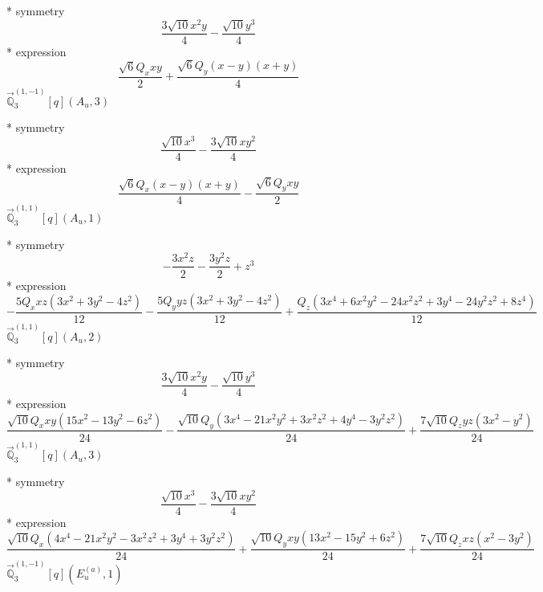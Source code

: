 \documentclass[fleqn,8pt]{jsarticle}
\begin{document}
\noindent\quad ** symmetry
\begin{dmath*}
\frac{3 \sqrt{10} x^{2} y}{4} - \frac{\sqrt{10} y^{3}}{4}
\end{dmath*}
\noindent\quad ** expression
\begin{dmath*}
\frac{\sqrt{6} Q_{x} x y}{2} + \frac{\sqrt{6} Q_{y} \left(x - y\right) \left(x + y\right)}{4}
\end{dmath*}
\noindent\quad $\vec{\mathbb{Q}}_{3}^{(1,-1)}[q](A_{u},3)$

\noindent\quad ** symmetry
\begin{dmath*}
\frac{\sqrt{10} x^{3}}{4} - \frac{3 \sqrt{10} x y^{2}}{4}
\end{dmath*}
\noindent\quad ** expression
\begin{dmath*}
\frac{\sqrt{6} Q_{x} \left(x - y\right) \left(x + y\right)}{4} - \frac{\sqrt{6} Q_{y} x y}{2}
\end{dmath*}
\noindent\quad $\vec{\mathbb{Q}}_{3}^{(1,1)}[q](A_{u},1)$

\noindent\quad ** symmetry
\begin{dmath*}
- \frac{3 x^{2} z}{2} - \frac{3 y^{2} z}{2} + z^{3}
\end{dmath*}
\noindent\quad ** expression
\begin{dmath*}
- \frac{5 Q_{x} x z \left(3 x^{2} + 3 y^{2} - 4 z^{2}\right)}{12} - \frac{5 Q_{y} y z \left(3 x^{2} + 3 y^{2} - 4 z^{2}\right)}{12} + \frac{Q_{z} \left(3 x^{4} + 6 x^{2} y^{2} - 24 x^{2} z^{2} + 3 y^{4} - 24 y^{2} z^{2} + 8 z^{4}\right)}{12}
\end{dmath*}
\noindent\quad $\vec{\mathbb{Q}}_{3}^{(1,1)}[q](A_{u},2)$

\noindent\quad ** symmetry
\begin{dmath*}
\frac{3 \sqrt{10} x^{2} y}{4} - \frac{\sqrt{10} y^{3}}{4}
\end{dmath*}
\noindent\quad ** expression
\begin{dmath*}
\frac{\sqrt{10} Q_{x} x y \left(15 x^{2} - 13 y^{2} - 6 z^{2}\right)}{24} - \frac{\sqrt{10} Q_{y} \left(3 x^{4} - 21 x^{2} y^{2} + 3 x^{2} z^{2} + 4 y^{4} - 3 y^{2} z^{2}\right)}{24} + \frac{7 \sqrt{10} Q_{z} y z \left(3 x^{2} - y^{2}\right)}{24}
\end{dmath*}
\noindent\quad $\vec{\mathbb{Q}}_{3}^{(1,1)}[q](A_{u},3)$

\noindent\quad ** symmetry
\begin{dmath*}
\frac{\sqrt{10} x^{3}}{4} - \frac{3 \sqrt{10} x y^{2}}{4}
\end{dmath*}
\noindent\quad ** expression
\begin{dmath*}
\frac{\sqrt{10} Q_{x} \left(4 x^{4} - 21 x^{2} y^{2} - 3 x^{2} z^{2} + 3 y^{4} + 3 y^{2} z^{2}\right)}{24} + \frac{\sqrt{10} Q_{y} x y \left(13 x^{2} - 15 y^{2} + 6 z^{2}\right)}{24} + \frac{7 \sqrt{10} Q_{z} x z \left(x^{2} - 3 y^{2}\right)}{24}
\end{dmath*}
\noindent\quad $\vec{\mathbb{Q}}_{3}^{(1,-1)}[q](E_{u}^{(a)},1)$
\end{document}
